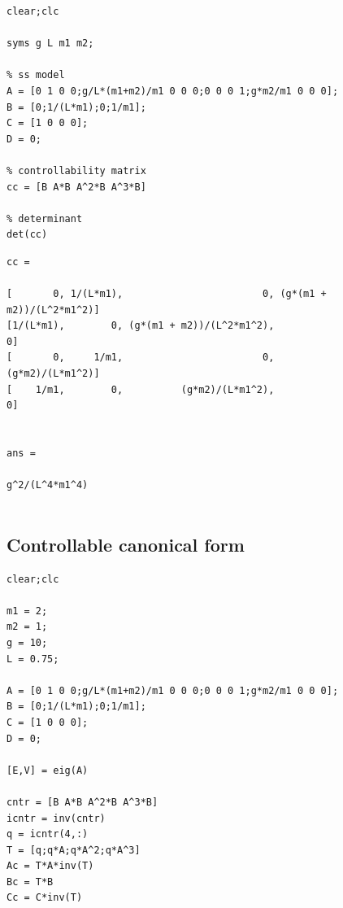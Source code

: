 \documentclass[12pt]{article}
\numberwithin{equation}{section}
\begin{document}
    \begin{verbatim}
clear;clc

syms g L m1 m2;

% ss model
A = [0 1 0 0;g/L*(m1+m2)/m1 0 0 0;0 0 0 1;g*m2/m1 0 0 0];
B = [0;1/(L*m1);0;1/m1];
C = [1 0 0 0];
D = 0;

% controllability matrix
cc = [B A*B A^2*B A^3*B]

% determinant
det(cc)
\end{verbatim}

        \color{lightgray} \begin{verbatim} 
cc =
 
[       0, 1/(L*m1),                        0, (g*(m1 + m2))/(L^2*m1^2)]
[1/(L*m1),        0, (g*(m1 + m2))/(L^2*m1^2),                        0]
[       0,     1/m1,                        0,          (g*m2)/(L*m1^2)]
[    1/m1,        0,          (g*m2)/(L*m1^2),                        0]
 
 
ans =
 
g^2/(L^4*m1^4)
 
\end{verbatim} \color{black}

\subsection{Controllable canonical form}
\label{app:ccf}
    \begin{verbatim}
clear;clc

m1 = 2;
m2 = 1;
g = 10;
L = 0.75;

A = [0 1 0 0;g/L*(m1+m2)/m1 0 0 0;0 0 0 1;g*m2/m1 0 0 0];
B = [0;1/(L*m1);0;1/m1];
C = [1 0 0 0];
D = 0;

[E,V] = eig(A)

cntr = [B A*B A^2*B A^3*B]
icntr = inv(cntr)
q = icntr(4,:)
T = [q;q*A;q*A^2;q*A^3]
Ac = T*A*inv(T)
Bc = T*B
Cc = C*inv(T)
\end{verbatim}
\end{document}
